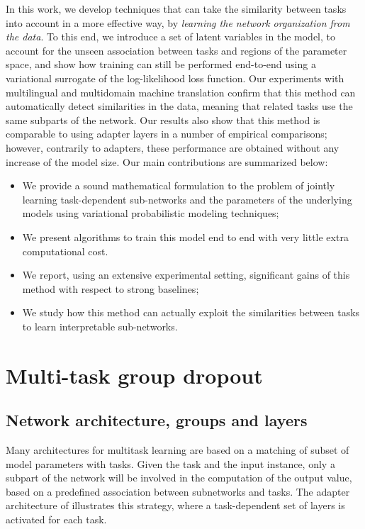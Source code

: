 \documentclass[11pt]{article}
\newcommand{\fyDone}[1]{\done[FY]\Todo[FY:]{\textcolor{orange}{#1}}}
\begin{document}
In this work, we develop techniques that can take the similarity between tasks into account in a more effective way, by \emph{learning the network organization from the data}. To this end, we introduce a set of latent variables in the model, to account for the unseen association between tasks and regions of the parameter space, and show how training can still be performed end-to-end using a variational surrogate of the log-likelihood loss function. Our experiments with multilingual and multidomain machine translation confirm that this method can automatically detect similarities in the data, meaning that related tasks use the same subparts of the network. Our results also show that this method is comparable to using adapter layers in a number of empirical comparisons; however, contrarily to adapters, these performance are obtained without any increase of the model size. Our main contributions are summarized below:
\begin{itemize}
  \setlength{\itemsep}{1pt}
  \setlength{\parskip}{0pt}
  \setlength{\parsep}{0pt}
\item We provide a sound mathematical formulation to the problem of jointly learning task-dependent sub-networks and the parameters of the underlying models using variational probabilistic modeling techniques;
\item We present algorithms to train this model end to end with very little extra computational cost.
\item We report, using an extensive experimental setting, significant gains of this method with respect to strong baselines;
\item We study how this method can actually exploit the similarities between tasks to learn interpretable sub-networks.
\end{itemize}
\fyDone{Can you do distillation ? That is only keep the parameter for one domain and still get good results (better than DA ?)}

\section{Multi-task group dropout \label{sec:architecture}}
\subsection{Network architecture, groups and layers}
Many architectures for multitask learning are based on a matching of subset of model parameters with tasks. Given the task and the input instance, only a subpart of the network will be involved in the computation of the output value, based on a predefined association between subnetworks and tasks. The adapter architecture of \citep{Bapna19simple} illustrates this strategy, where a task-dependent set of layers is activated for each task. 
\end{document}

